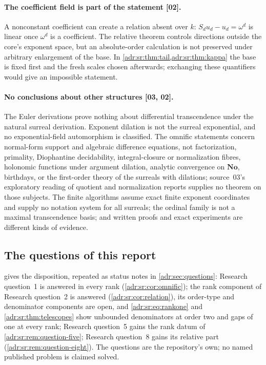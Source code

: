 \documentclass[11pt,letterpaper]{article}
\numberwithin{equation}{section}
\theoremstyle{definition}
\theoremstyle{remark}
\newcommand{\No}{\mathbf{No}}
\newcommand{\src}[1]{\textup{[#1]}}%
\begin{document}
\paragraph{The coefficient field is part of the statement \src{02}.} A
nonconstant coefficient can create a relation absent over $k$:
$S_du_d-u_d=\omega^d$ is linear once $\omega^d$ is a coefficient. The relative
theorem controls directions outside the core's exponent space, but an
absolute-order calculation is not preserved under arbitrary enlargement of the
base. In \cref{adr:sr:thm:tail,adr:sr:thm:kappa} the base is fixed first and
the fresh scales chosen afterwards; exchanging these quantifiers would give an
impossible statement.

\paragraph{No conclusions about other structures \src{03, 02}.} The Euler
derivations prove nothing about differential transcendence under the natural
surreal derivation. Exponent dilation is not the surreal exponential, and no
exponential-field automorphism is classified. The omnific statements concern
normal-form support and algebraic difference equations, not factorization,
primality, Diophantine decidability, integral-closure or normalization fibres,
holonomic functions under argument dilation, analytic convergence on $\No$,
birthdays, or the first-order theory of the surreals with dilations; source~03's
exploratory reading of quotient and normalization reports supplies no theorem
on those subjects. The finite algorithms assume exact finite exponent
coordinates and supply no notation system for all surreals; the ordinal family
is not a maximal transcendence basis; and written proofs and exact experiments
are different kinds of evidence.

\subsection{The questions of this report}
\label{adr:sr:sec:status}

 gives the disposition, repeated as status notes in
\cref{adr:sec:questions}: Research question~1 is answered in every rank
(\cref{adr:sr:cor:omnific}); the rank component of Research question~2 is
answered (\cref{adr:sr:cor:relation}), its order-type and denominator
components are open, and \eqref{adr:sr:eq:rankone} and
\cref{adr:sr:thm:telescopes} show unbounded denominators at order two and gaps
of one at every rank; Research question~5 gains the rank datum of
\cref{adr:sr:rem:question-five}; Research question~8 gains its relative part
(\cref{adr:sr:rem:question-eight}). The questions are the repository's own; no
named published problem is claimed solved.
\end{document}

